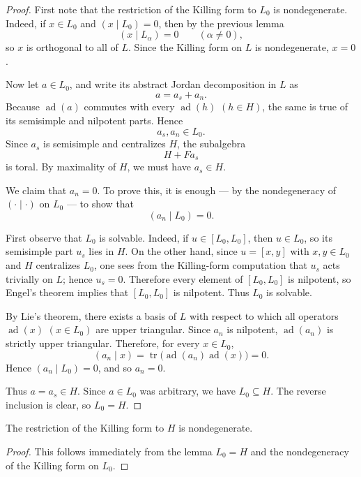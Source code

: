 \begin{proof}
    First note that the restriction of the Killing form to $L_0$ is nondegenerate.
    Indeed, if $x\in L_0$ and $(x\mid L_0)=0$, then by the previous lemma
    \[
        (x\mid L_\alpha)=0
        \qquad (\alpha\neq 0),
    \]
    so $x$ is orthogonal to all of $L$. Since the Killing form on $L$ is nondegenerate,
    $x=0$.

    Now let $a\in L_0$, and write its abstract Jordan decomposition in $L$ as
    \[
        a=a_s+a_n.
    \]
    Because $\operatorname{ad}(a)$ commutes with every $\operatorname{ad}(h)$ $(h\in H)$,
    the same is true of its semisimple and nilpotent parts. Hence
    \[
        a_s,a_n\in L_0.
    \]
    Since $a_s$ is semisimple and centralizes $H$, the subalgebra
    \[
        H+Fa_s
    \]
    is toral. By maximality of $H$, we must have $a_s\in H$.

    We claim that $a_n=0$. To prove this, it is enough --- by the nondegeneracy
    of $(\cdot\mid\cdot)$ on $L_0$ --- to show that
    \[
        (a_n\mid L_0)=0.
    \]

    First observe that $L_0$ is solvable. Indeed, if $u\in [L_0,L_0]$, then
    $u\in L_0$, so its semisimple part $u_s$ lies in $H$. On the other hand, since
    $u=[x,y]$ with $x,y\in L_0$ and $H$ centralizes $L_0$, one sees from the
    Killing-form computation that $u_s$ acts trivially on $L$; hence $u_s=0$.
    Therefore every element of $[L_0,L_0]$ is nilpotent, so Engel's theorem
    implies that $[L_0,L_0]$ is nilpotent. Thus $L_0$ is solvable.

    By Lie's theorem, there exists a basis of $L$ with respect to which all operators
    $\operatorname{ad}(x)$ $(x\in L_0)$ are upper triangular. Since $a_n$ is nilpotent,
    $\operatorname{ad}(a_n)$ is strictly upper triangular. Therefore, for every
    $x\in L_0$,
    \[
        (a_n\mid x)
        =
        \operatorname{tr}\bigl(\operatorname{ad}(a_n)\operatorname{ad}(x)\bigr)=0.
    \]
    Hence $(a_n\mid L_0)=0$, and so $a_n=0$.

    Thus $a=a_s\in H$. Since $a\in L_0$ was arbitrary, we have $L_0\subseteq H$.
    The reverse inclusion is clear, so $L_0=H$.
\end{proof}

\begin{corollary}
    The restriction of the Killing form to $H$ is nondegenerate.
\end{corollary}

\begin{proof}
    This follows immediately from the lemma $L_0=H$ and the nondegeneracy
    of the Killing form on $L_0$.
\end{proof}

